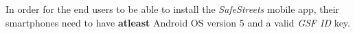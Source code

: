 In order for the end users to be able to install the \emph{SafeStreets} mobile app, their smartphones need to have \textbf{atleast} Android OS version 5 and a valid \emph{GSF ID} key.